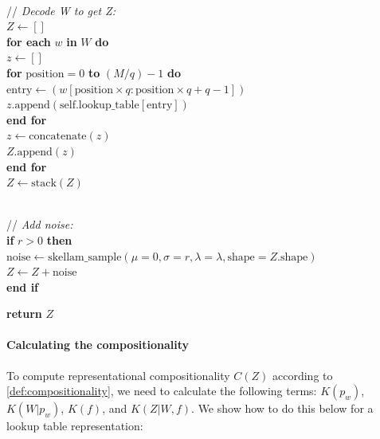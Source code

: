 \documentclass{article} %
\newcommand{\comp}{representational compositionality}
\begin{document}
\begin{appendices}
\begin{algorithm}
\begin{algorithmic}
\item 
\\ // \textit{Decode W to get Z:}
\\ $Z \leftarrow []$
\\ \textbf{for each} $w$ \textbf{in} $W$ \textbf{do}
\\ \hspace{1em} $z \leftarrow []$
\\ \hspace{1em} \textbf{for} $\text{position} = 0$ \textbf{to} $(M / q) - 1$ \textbf{do}
\\ \hspace{2em} $\text{entry} \leftarrow (w[\text{position} \times q:\text{position} \times q + q - 1])$
\\ \hspace{2em} $z.\text{append}(\text{self.lookup\_table}[\text{entry}])$
\\ \hspace{1em} \textbf{end for}
\\ \hspace{1em} $z \leftarrow \text{concatenate}(z)$ 
\\ \hspace{1em} $Z.\text{append}(z)$
\\ \textbf{end for}
\\ $Z \leftarrow \text{stack}(Z)$

\item 
\\ // \textit{Add noise:}
\\ \textbf{if} $r > 0$ \textbf{then}
\\ \hspace{1em} $\text{noise} \leftarrow \text{skellam\_sample}(\mu=0, \sigma=r, \lambda=\lambda, \text{shape}=Z.\text{shape})$
\\ \hspace{1em} $Z \leftarrow Z + \text{noise}$
\\ \textbf{end if}

\item \textbf{return} $Z$
\end{algorithmic}
\end{algorithm}

\paragraph{Calculating the compositionality}

To compute \comp{} $C(Z)$ according to \cref{def:compositionality}, we need to calculate the following terms: $K(p_w)$, $K(W|p_w)$, $K(f)$, and  $K(Z|W,f)$. We show how to do this below for a lookup table representation:


\end{appendices}
\end{document}
